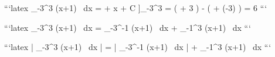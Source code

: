 \documentclass{article}
\begin{document}
```latex
\int_{-3}^{3} (x+1) \, dx =  + x + C \Big]_{-3}^{3} = \left( + 3 \right) - \left( + (-3) \right) = 6
```

```latex
\int_{-3}^{3} (x+1) \, dx = \int_{-3}^{-1} (x+1) \, dx + \int_{-1}^{3} (x+1) \, dx
```

```latex
\left| \int_{-3}^{3} (x+1) \, dx \right| = \left| \int_{-3}^{-1} (x+1) \, dx \right| + \int_{-1}^{3} (x+1) \, dx
```
\end{document}
